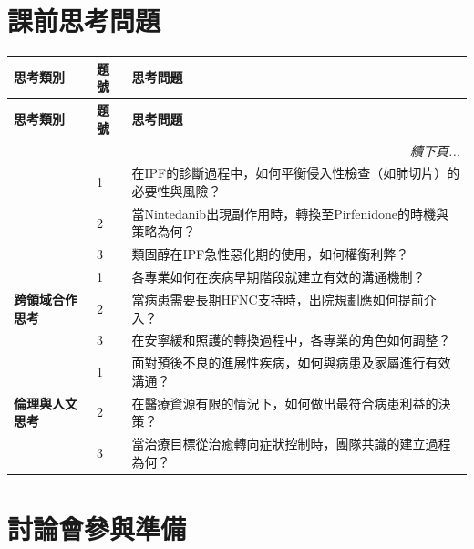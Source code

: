\documentclass{article}
\begin{document}
\section{課前思考問題}

\begin{longtable}{p{3.5cm} p{1cm} p{10.5cm}}
\toprule
\textbf{思考類別} & \textbf{題號} & \textbf{思考問題} \\
\midrule
\endfirsthead
\toprule
\textbf{思考類別} & \textbf{題號} & \textbf{思考問題} \\
\midrule
\endhead
\midrule
\multicolumn{3}{r}{\textit{續下頁...}} \\
\endfoot
\bottomrule
\endlastfoot

\multirow{3}{3.5cm}{\textbf{臨床決策思考}} & 1 & 在IPF的診斷過程中，如何平衡侵入性檢查（如肺切片）的必要性與風險？ \\
 & 2 & 當Nintedanib出現副作用時，轉換至Pirfenidone的時機與策略為何？ \\
 & 3 & 類固醇在IPF急性惡化期的使用，如何權衡利弊？ \\

\multirow{3}{3.5cm}{\textbf{跨領域合作思考}} & 1 & 各專業如何在疾病早期階段就建立有效的溝通機制？ \\
 & 2 & 當病患需要長期HFNC支持時，出院規劃應如何提前介入？ \\
 & 3 & 在安寧緩和照護的轉換過程中，各專業的角色如何調整？ \\

\multirow{3}{3.5cm}{\textbf{倫理與人文思考}} & 1 & 面對預後不良的進展性疾病，如何與病患及家屬進行有效溝通？ \\
 & 2 & 在醫療資源有限的情況下，如何做出最符合病患利益的決策？ \\
 & 3 & 當治療目標從治癒轉向症狀控制時，團隊共識的建立過程為何？ \\
\end{longtable}

\section{討論會參與準備}
\end{document}
